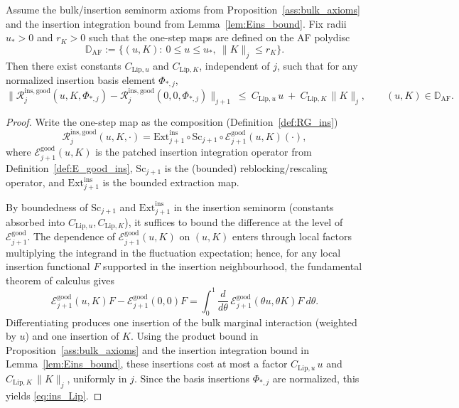 \begin{lemma}\label{lem:ins_step_Lip}
Assume the bulk/insertion seminorm axioms from Proposition~\ref{ass:bulk_axioms} and the insertion integration bound from Lemma~\ref{lem:Eins_bound}.
Fix radii $u_\ast>0$ and $r_K>0$ such that the one-step maps are defined on the AF polydisc
\[
\mathbb D_{\mathrm{AF}}:=\{(u,K):\ 0\le u\le u_\ast,\ \|K\|_j\le r_K\}.
\]
Then there exist constants $C_{\mathrm{Lip},u}$ and $C_{\mathrm{Lip},K}$, independent of $j$, such that for any normalized insertion basis element $\Phi_{*,j}$,
\begin{equation}\label{eq:ins_Lip}
\big\|\mathcal R^{\mathrm{ins,good}}_j(u,K,\Phi_{*,j})-\mathcal R^{\mathrm{ins,good}}_j(0,0,\Phi_{*,j})\big\|_{j+1}
\ \le\ C_{\mathrm{Lip},u}\,u\ +\ C_{\mathrm{Lip},K}\,\|K\|_j,
\qquad (u,K)\in\mathbb D_{\mathrm{AF}}.
\end{equation}
\end{lemma}

\begin{proof}
Write the one-step map as the composition (Definition~\ref{def:RG_ins})
\[
\mathcal R^{\mathrm{ins,good}}_j(u,K,\cdot)=\mathrm{Ext}^{\mathrm{ins}}_{j+1}\circ \mathrm{Sc}_{j+1}\circ \mathcal E^{\mathrm{good}}_{j+1}(u,K)(\cdot),
\]
where $\mathcal E^{\mathrm{good}}_{j+1}(u,K)$ is the patched insertion integration operator from Definition~\ref{def:E_good_ins},
$\mathrm{Sc}_{j+1}$ is the (bounded) reblocking/rescaling operator, and $\mathrm{Ext}^{\mathrm{ins}}_{j+1}$ is the bounded extraction map.

By boundedness of $\mathrm{Sc}_{j+1}$ and $\mathrm{Ext}^{\mathrm{ins}}_{j+1}$ in the insertion seminorm (constants absorbed into $C_{\mathrm{Lip},u},C_{\mathrm{Lip},K}$),
it suffices to bound the difference at the level of $\mathcal E^{\mathrm{good}}_{j+1}$.
The dependence of $\mathcal E^{\mathrm{good}}_{j+1}(u,K)$ on $(u,K)$ enters through local factors multiplying the integrand in the fluctuation expectation;
hence, for any local insertion functional $F$ supported in the insertion neighbourhood, the fundamental theorem of calculus gives
\[
\mathcal E^{\mathrm{good}}_{j+1}(u,K)F-\mathcal E^{\mathrm{good}}_{j+1}(0,0)F
=\int_0^1 \frac{d}{d\theta}\,\mathcal E^{\mathrm{good}}_{j+1}(\theta u,\theta K)F\ d\theta.
\]
Differentiating produces one insertion of the bulk marginal interaction (weighted by $u$) and one insertion of $K$.
Using the product bound in Proposition~\ref{ass:bulk_axioms} and the insertion integration bound in Lemma~\ref{lem:Eins_bound},
these insertions cost at most a factor $C_{\mathrm{Lip},u}\,u$ and $C_{\mathrm{Lip},K}\,\|K\|_j$, uniformly in $j$.
Since the basis insertions $\Phi_{*,j}$ are normalized, this yields \eqref{eq:ins_Lip}.
\end{proof}

